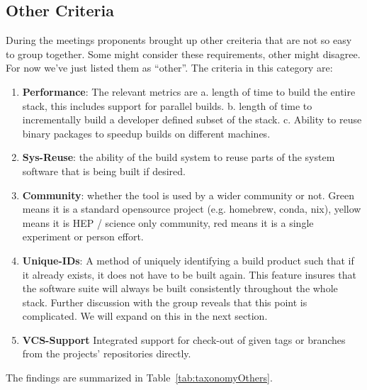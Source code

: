 \documentclass[12pt,a4paper]{article}
\begin{document}
\subsection{Other Criteria}
During the meetings proponents brought up other creiteria that are not so easy to group together.  Some might consider these requirements, other might disagree. For now we've just listed them as ``other''. The criteria in this category are:
\begin{enumerate}
\item \textbf{Performance}: The relevant metrics are a. length of time to build the entire stack, this includes support for parallel builds. b. length of time to incrementally build a developer defined subset of the stack. c. Ability to reuse binary packages to speedup builds on different machines.
\item \textbf{Sys-Reuse}: the ability of the build system to reuse parts of the system software that is being built if desired.
\item \textbf{Community}: whether the tool is used by a wider community or not. Green means it is a standard opensource project (e.g. homebrew, conda, nix), yellow means it is HEP / science only community, red means it is a single experiment or person effort.
\item \textbf{Unique-IDs}: A method of uniquely identifying a build product such that if it already exists, it does not have to be built again. This feature insures that the software suite will always be built consistently throughout the whole stack. Further discussion with the group reveals that this point is complicated. We will expand on this in the next section.
  \item \textbf{VCS-Support} Integrated support for check-out of given tags or branches from the projects’ repositories directly.
\end{enumerate}
The findings are summarized in Table~\ref{tab:taxonomyOthers}. 
\end{document}
